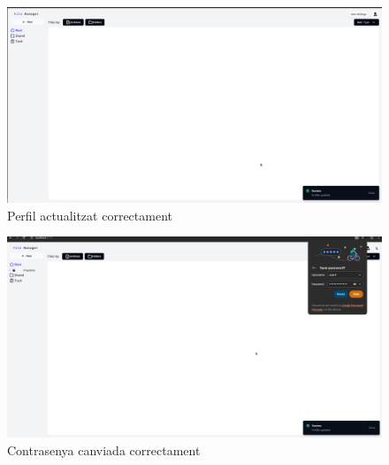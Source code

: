 \begin{figure}[H]
\centering
\includegraphics[width=0.8\linewidth]{Figures/implementacio/updateUserSuccess.png}
\caption{Perfil actualitzat correctament}
\label{fig:updateUserSuccess}
\end{figure}

\begin{figure}[H]
\centering
\includegraphics[width=0.8\linewidth]{Figures/implementacio/updateProfilePasswordSuccess.png}
\caption{Contrasenya canviada correctament}
\label{fig:updateProfilePasswordSuccess}
\end{figure}

